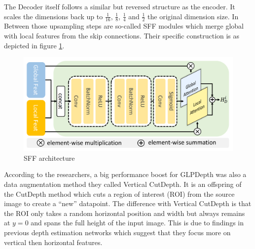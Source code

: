 The Decoder itself follows a similar but reversed structure as the encoder. It scales the dimensions back up to $\frac{1}{16}$, $\frac{1}{8}$, $\frac{1}{4}$ and $\frac{1}{2}$ the original dimension size. In Between those upsampling steps are so-called SFF modules which merge global with local features from the skip connections. Their specific construction is as depicted in figure \ref*{SFF_arch}.

\begin{figure}[ht]
    \begin{center}
        \includegraphics*[scale=.2, pagebox=artbox]{resources/SFF.png}
        \caption{SFF architecture \cite{kim2022global}} \label{SFF_arch}
    \end{center}
\end{figure}

According to the researchers, a big performance boost for GLPDepth was also a data augmentation method they called Vertical CutDepth. It is an offspring of the CutDepth method \cite{ishii} which cuts a region of interest (ROI) from the source image to create a \enquote{new} datapoint. The difference with Vertical CutDepth is that the ROI only takes a random horizontal position and width but always remains at $y=0$ and spans the full height of the input image. This is due to findings \cite{dijk} in previous depth estimation networks which suggest that they focus more on vertical then horizontal features.